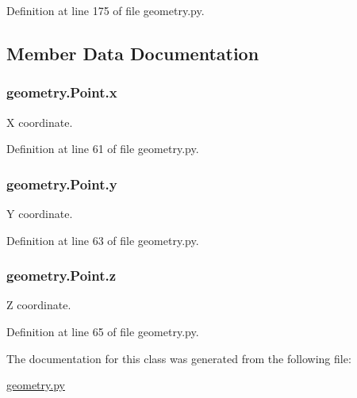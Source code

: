Definition at line 175 of file geometry.\+py.



\subsection{Member Data Documentation}
\subsubsection[{\texorpdfstring{x}{x}}]{\setlength{\rightskip}{0pt plus 5cm}geometry.\+Point.\+x}\hypertarget{classgeometry_1_1Point_a98f21eef44d1c182f04f1262c90815fc}{}\label{classgeometry_1_1Point_a98f21eef44d1c182f04f1262c90815fc}


X coordinate. 



Definition at line 61 of file geometry.\+py.

\subsubsection[{\texorpdfstring{y}{y}}]{\setlength{\rightskip}{0pt plus 5cm}geometry.\+Point.\+y}\hypertarget{classgeometry_1_1Point_a4ef9a436e11219296ba5e3fff9e87711}{}\label{classgeometry_1_1Point_a4ef9a436e11219296ba5e3fff9e87711}


Y coordinate. 



Definition at line 63 of file geometry.\+py.

\subsubsection[{\texorpdfstring{z}{z}}]{\setlength{\rightskip}{0pt plus 5cm}geometry.\+Point.\+z}\hypertarget{classgeometry_1_1Point_afd1ce6427fa3e28c9c42934bb5d76165}{}\label{classgeometry_1_1Point_afd1ce6427fa3e28c9c42934bb5d76165}


Z coordinate. 



Definition at line 65 of file geometry.\+py.



The documentation for this class was generated from the following file\+:\begin{DoxyCompactItemize}
\item 
\hyperlink{geometry_8py}{geometry.\+py}\end{DoxyCompactItemize}
